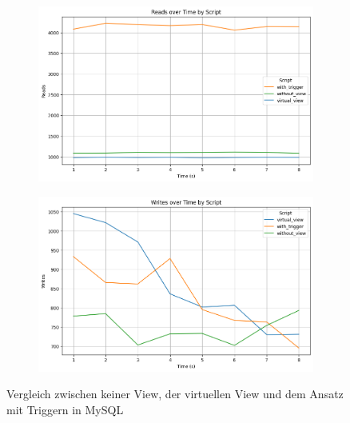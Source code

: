 \begin{figure}[H]
    \centering
    \begin{subfigure}[t]{0.48\textwidth}
        \includegraphics[width=\textwidth]{PNGs/Script/Views/view-comparison/Reads}
    \end{subfigure}
    \hfill
    \begin{subfigure}[t]{0.48\textwidth}
        \includegraphics[width=\textwidth]{PNGs/Script/Views/view-comparison/Writes}
    \end{subfigure}
    \vspace{-20pt}
    \caption[Views: Keine View, virtuelle View und Ansatz mit Triggern]{Vergleich zwischen keiner View, der virtuellen View und dem Ansatz mit Triggern in MySQL}
    \label{fig:view-comparison-comp-metric}
\end{figure}
\vspace{-12pt}

